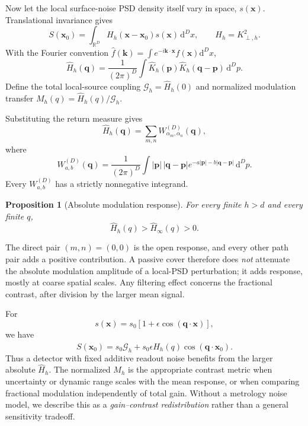 \documentclass[aps,pra,twocolumn,superscriptaddress,longbibliography,nofootinbib,floatfix]{revtex4-2}
\newtheorem{proposition}{Proposition}
\theoremstyle{remark}
\newcommand{\dd}{\mathrm d}
\newcommand{\R}{\mathbb R}
\newcommand{\kvec}{\bm k}
\newcommand{\qvec}{\bm q}
\newcommand{\G}{\mathcal G}
\newcommand{\Khat}{\widehat K}
\newcommand{\Hhat}{\widehat H}
\begin{document}
Now let the local surface-noise PSD density itself vary in space, $s(\bm x)$.  Translational invariance gives
\begin{equation}
S(\bm x_0)=\int_{\R^D}H_h(\bm x-\bm x_0)s(\bm x)\,\dd^D x,
\qquad H_h=K_{\perp,h}^2.
\label{eq:conv}
\end{equation}
With the Fourier convention $\widehat f(\kvec)=\int e^{-i\kvec\cdot\bm x}f(\bm x)\dd^Dx$,
\begin{equation}
\Hhat_h(\qvec)=\frac{1}{(2\pi)^D}\int
\Khat_h(\bm p)\Khat_h(\qvec-\bm p)\,\dd^Dp.
\label{eq:Hconv}
\end{equation}
Define the total local-source coupling $\G_h=\Hhat_h(0)$ and normalized modulation transfer $M_h(q)=\Hhat_h(q)/\G_h$.

Substituting the return measure gives
\begin{equation}
\Hhat_h(\qvec)=\sum_{m,n}W^{(D)}_{\alpha_m,\alpha_n}(\qvec),
\end{equation}
where
\begin{equation}
W^{(D)}_{a,b}(\qvec)=\frac{1}{(2\pi)^D}\int
|\bm p|\,|\qvec-\bm p|e^{-a|\bm p|-b|\qvec-\bm p|}\,\dd^Dp.
\label{eq:W}
\end{equation}
Every $W^{(D)}_{a,b}$ has a strictly nonnegative integrand.

\begin{proposition}[Absolute modulation response]
\label{prop:absolute}
For every finite $h>d$ and every finite $q$,
\begin{equation}
\boxed{\displaystyle
\Hhat_h(q)>\Hhat_\infty(q)>0.}
\label{eq:absoluteineq}
\end{equation}
\end{proposition}

The direct pair $(m,n)=(0,0)$ is the open response, and every other path pair adds a positive contribution.  A passive cover therefore does \emph{not} attenuate the absolute modulation amplitude of a local-PSD perturbation; it adds response, mostly at coarse spatial scales.  Any filtering effect concerns the fractional contrast, after division by the larger mean signal.

For
\begin{equation}
s(\bm x)=s_0[1+\epsilon\cos(\qvec\cdot\bm x)],
\end{equation}
we have
\begin{equation}
S(\bm x_0)=s_0\G_h+s_0\epsilon\Hhat_h(q)\cos(\qvec\cdot\bm x_0).
\label{eq:responseabs}
\end{equation}
Thus a detector with fixed additive readout noise benefits from the larger absolute $\Hhat_h$.  The normalized $M_h$ is the appropriate contrast metric when uncertainty or dynamic range scales with the mean response, or when comparing fractional modulation independently of total gain.  Without a metrology noise model, we describe this as a \emph{gain--contrast redistribution} rather than a general sensitivity tradeoff.
\end{document}
